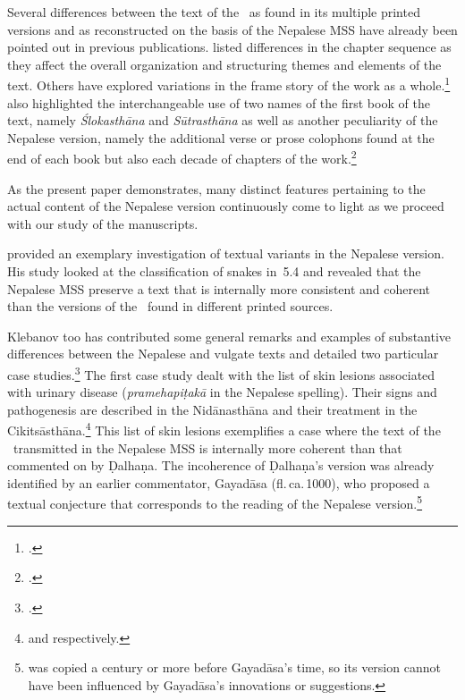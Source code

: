 
Several differences between the text of the \SS\ as found in its multiple printed versions and 
as reconstructed on the basis of the Nepalese MSS have already been pointed out in previous 
publications.  \citet[27\,f]{kleb-2021b} listed differences in the chapter sequence as they 
affect
the overall organization and structuring themes and elements of the text.  Others have 
explored variations in the frame story of the work as a whole.\footcites
    {wuja-2013} 		
    [28-32]{kleb-2021b} 
    {birc-2021} 
    [2-4]{birc-2021a}
\citeauthor{kleb-2021b} also highlighted the interchangeable use of two names of the
first book of the text, namely \emph{Ślokasthāna} and \emph{Sūtrasthāna} as well
as another peculiarity of the Nepalese version, namely the additional verse or prose
colophons found at the end of each book but also each decade of chapters of the
work.\footcite[32--44]{kleb-2021b}

As the present paper demonstrates, many distinct features pertaining to the actual
content of the Nepalese version continuously come to light as we proceed with our
study of the manuscripts. 

\citet[101–104]{hari-2011} provided an exemplary investigation of textual variants in the 
Nepalese version.  His study looked at the classification of snakes in
\SS\,5.4 and revealed that the Nepalese MSS preserve a text that is internally
more consistent and coherent than the versions of the \SS\ found
in different printed sources.

Klebanov too has contributed some general remarks and examples of substantive differences 
between the Nepalese and vulgate texts 
and detailed two particular case studies.\footcite[44--55]{kleb-2021b} The first
case study dealt with the list of skin lesions associated with urinary disease
(\emph{pramehapiṭakā} in the Nepalese spelling).  Their signs and pathogenesis are
described in the Nidānasthāna and their treatment in the 
Cikitsāsthāna.\footnote{ and 
 respectively.} 
This list of skin lesions exemplifies a case where the text of the \SS\ transmitted
in the Nepalese MSS is internally more coherent than that commented on by Ḍalhaṇa.
The incoherence of Ḍalhaṇa's version was already identified by an earlier
commentator, Gayadāsa (fl.\,ca.\,1000), 
who
proposed a textual conjecture that corresponds to the reading of the Nepalese
version.\footnote{ was copied a century or more before
    Gayadāsa's time, so its version cannot have been influenced by Gayadāsa's
    innovations or suggestions.} 

